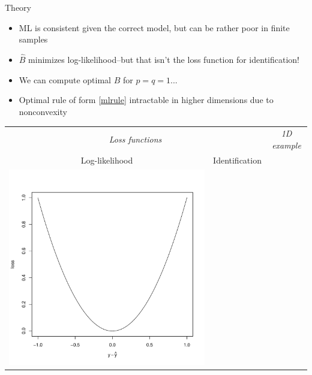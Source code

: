 \documentclass[final]{beamer}
\newlength{\onecolwid}
\begin{document}
\begin{frame}[t]
\begin{columns}[t]
\begin{column}{\onecolwid}
\begin{block}{Theory}
\begin{itemize}
\item ML is consistent given the correct model, but can be rather poor in finite samples
\item $\hat{B}$ minimizes log-likelihood--but that isn't the loss function for identification!
\item We can compute optimal $\hat{B}$ for $p = q = 1$... 
\item Optimal rule of form \eqref{mlrule} intractable in higher dimensions due to nonconvexity
\end{itemize}
\begin{center}
\begin{tabular}{cc|c}
\multicolumn{2}{c}{\emph{Loss functions}} & {\emph{1D example}}\\
{\small Log-likelihood} & {\small Identification} & \\
\includegraphics[scale = 0.6, trim = 1in 1in 0.5in 1in, clip]{loss_se.pdf} & 

\end{tabular}
\end{center}
\end{block}
\end{column}
\end{columns}
\end{frame}
\end{document}
